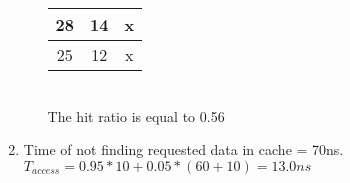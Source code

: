 \documentclass[12pt]{article}
\begin{document}
\begin{enumerate}
\begin{enumerate}
\begin{table}[h!]
\begin{tabular}{|c|c|c|}
                        28 &14&x\\ \hline
                        25 &12&x\\ \hline
                \end{tabular}
            \end{table}
            \\ The hit ratio is equal to 0.56
        \end{enumerate}
    \item \mbox{}
        Time of not finding requested data in cache = 70ns.\\
        $T_{access}=0.95*10+0.05*(60+10)=13.0ns$
\end{enumerate}
\end{document}
